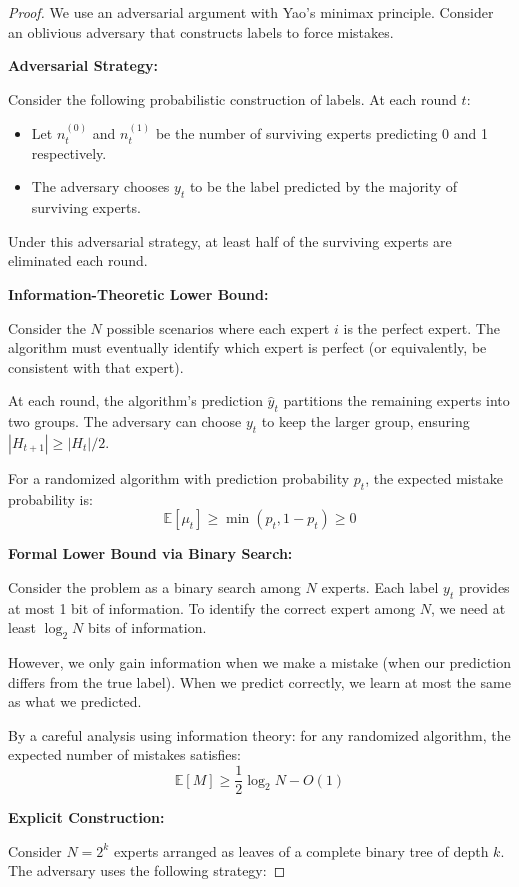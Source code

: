 \documentclass[letterpaper, 11pt]{article}
\newcommand{\1}{\mathds{1}}	%
\theoremstyle{definition}
\begin{document}
\begin{proof}
We use an adversarial argument with Yao's minimax principle. Consider an oblivious adversary that constructs labels to force mistakes.

\textbf{Adversarial Strategy:}

Consider the following probabilistic construction of labels. At each round $t$:
\begin{itemize}
    \item Let $n_t^{(0)}$ and $n_t^{(1)}$ be the number of surviving experts predicting 0 and 1 respectively.
    \item The adversary chooses $y_t$ to be the label predicted by the majority of surviving experts.
\end{itemize}

Under this adversarial strategy, at least half of the surviving experts are eliminated each round.

\textbf{Information-Theoretic Lower Bound:}

Consider the $N$ possible scenarios where each expert $i$ is the perfect expert. The algorithm must eventually identify which expert is perfect (or equivalently, be consistent with that expert).

At each round, the algorithm's prediction $\widehat{y}_t$ partitions the remaining experts into two groups. The adversary can choose $y_t$ to keep the larger group, ensuring $|H_{t+1}| \geq |H_t|/2$.

For a randomized algorithm with prediction probability $p_t$, the expected mistake probability is:
$$\mathbb{E}[\mu_t] \geq \min(p_t, 1-p_t) \geq 0$$

\textbf{Formal Lower Bound via Binary Search:}

Consider the problem as a binary search among $N$ experts. Each label $y_t$ provides at most 1 bit of information. To identify the correct expert among $N$, we need at least $\log_2 N$ bits of information.

However, we only gain information when we make a mistake (when our prediction differs from the true label). When we predict correctly, we learn at most the same as what we predicted.

By a careful analysis using information theory: for any randomized algorithm, the expected number of mistakes satisfies:
$$\mathbb{E}[M] \geq \frac{1}{2}\log_2 N - O(1)$$

\textbf{Explicit Construction:}

Consider $N = 2^k$ experts arranged as leaves of a complete binary tree of depth $k$. The adversary uses the following strategy:


\end{proof}
\end{document}
